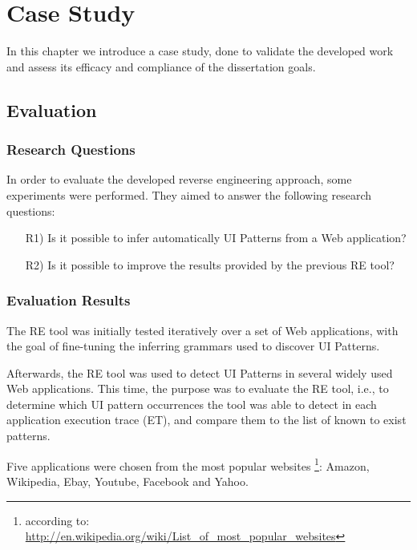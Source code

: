 \chapter{Case Study}\label{chap:validation}

In this chapter we introduce a case study, done to validate the developed work and assess its efficacy and compliance of the dissertation goals. 

\section{Evaluation}\label{sec:eval}

\subsection{Research Questions}

In order to evaluate the developed reverse engineering approach, some experiments were performed. They aimed to answer the following research questions:

\begin{itemize}
  \item[R1)] Is it possible to infer automatically UI Patterns from a Web application?\\
  \item[R2)] Is it possible to improve the results provided by the previous RE tool?\\
\end{itemize}

\subsection{Evaluation Results}

The RE tool was initially tested iteratively over a set of Web applications, with the goal of fine-tuning the inferring grammars used to discover UI Patterns.

Afterwards, the RE tool was used to detect UI Patterns in several widely used Web applications. This time, the purpose was to evaluate the RE tool, i.e., to determine which UI pattern occurrences the tool was able to detect in each application execution trace (ET), and compare them to the list of known to exist patterns.

Five applications were chosen from the most popular websites
\footnote{according to: \protect\url{http://en.wikipedia.org/wiki/List_of_most_popular_websites}}: Amazon, Wikipedia, Ebay, Youtube, Facebook and Yahoo.

